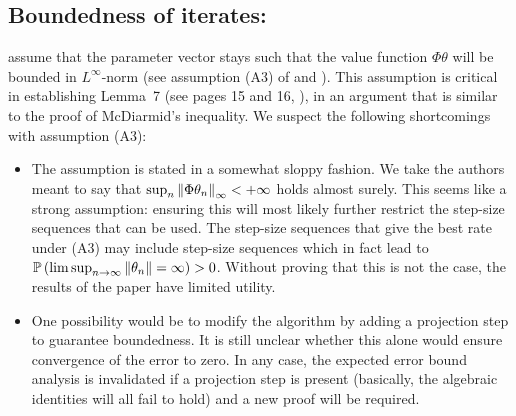 \documentclass{article}
\newcommand{\Prob}[1]{\mathbb{P}\left(#1\right)}
\begin{document}
\subsection{Boundedness of iterates: \citet{flstda}}
\citet{flstda} assume that the parameter vector stays such that the value function $\Phi \theta$  will be bounded in $L^\infty$-norm (see assumption (A3) of \cite{flstd} and \cite{flstda}). This assumption is critical in establishing Lemma~7 (see pages 15 and 16, \cite{flstda}), in an argument that is similar to the proof of McDiarmid's inequality.
We suspect the following shortcomings with assumption (A3):
\begin{itemize}
\item The assumption is stated in a somewhat sloppy fashion. We take the authors meant to say that $\sup_n \left\| \Phi \theta_n\right\|_\infty<+\infty$ holds almost surely. This seems like a strong assumption:  ensuring this will most likely further restrict the step-size sequences that can be used. The step-size sequences that give the best rate under (A3) may include step-size sequences which in fact lead to $\Prob{\limsup_{n\to\infty}\norm{\theta_n}=\infty}>0$. Without proving that this is not the case, the results of the paper have limited utility.
\item One possibility would be to modify the algorithm by adding a projection step to guarantee boundedness.
It is still unclear  whether this alone would ensure convergence of the error to zero. In any case, the expected error bound analysis is invalidated if a projection step is present (basically, the algebraic identities will all fail to hold) and a new proof will be required.

\end{itemize}
\end{document}
